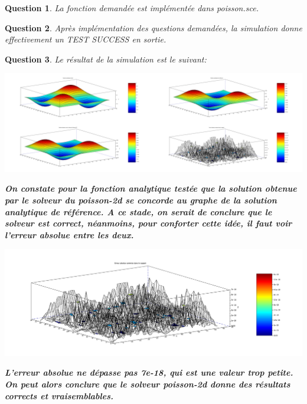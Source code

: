 \documentclass[a4paper,10pt]{article}
\newtheorem{question}{Question}
\begin{document}
\vskip 1cm
\begin{question}
La fonction demandée est implémentée dans poisson.sce.
\end{question}
\vskip 1cm
\begin{question}
Après implémentation des questions demandées, la simulation donne effectivement un TEST SUCCESS en sortie.
\end{question}
\vskip 1cm
\begin{question}
Le résultat de la simulation est le suivant:
\begin{center}
\includegraphics[scale=0.2]{poisson_error.png}
\label{fig1}
\end{center}
\vskip 0.5cm
\textbf{On constate pour la fonction analytique testée que la solution obtenue par le solveur du poisson-2d se concorde au graphe de la solution analytique de référence. A ce stade, on serait de conclure que le solveur est correct, néanmoins, pour conforter cette idée, il faut voir l'erreur absolue entre les deux.}
\vskip 1cm
\begin{center}
\includegraphics[scale=0.2]{error.png}
\label{fig1}
\end{center}
\textbf{L'erreur absolue ne dépasse pas  7e-18, qui est une valeur trop petite. On peut alors conclure que le solveur poisson-2d donne des résultats corrects et vraisemblables.}
\end{question}
\end{document}
